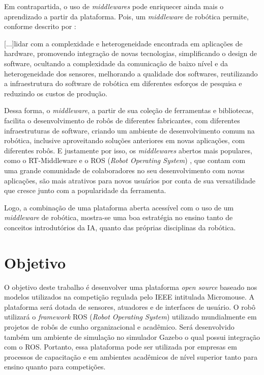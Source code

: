 Em contrapartida, o uso de \textit{middlewares} pode enriquecer ainda mais o aprendizado a partir da plataforma. Pois, um \textit{middleware} de robótica permite, conforme descrito por :

\begin{quoting}[rightmargin=0cm,leftmargin=4cm]
	\begin{singlespace}
		{\footnotesize
			[...]lidar com a complexidade e heterogeneidade encontrada em aplicações de hardware, promovendo integração de novas tecnologias, simplificando o design de software, ocultando a complexidade da comunicação de baixo nível e da heterogeneidade dos sensores, melhorando a qualidade dos softwares, reutilizando a infraestrutura do software de robótica em diferentes esforços de pesquisa e reduzindo os custos de produção.
		}
	\end{singlespace}
\end{quoting}

Dessa forma, o \textit{middleware}, a partir de sua coleção de ferramentas e bibliotecas, facilita o desenvolvimento de robôs de diferentes fabricantes, com diferentes infraestruturas de software, criando um ambiente de desenvolvimento comum na robótica, inclusive aproveitando soluções anteriores em novas aplicações, com diferentes robôs. E justamente por isso, os \textit{middlewares} abertos mais populares, como o RT-Middleware e o ROS (\textit{Robot Operating System}) \cite{Elkady2012}, que contam com uma grande comunidade de colaboradores no seu desenvolvimento com novas aplicações, são mais atrativos para novos usuários por conta de sua versatilidade que cresce junto com a popularidade da ferramenta.

Logo, a combinação de uma plataforma aberta acessível com o uso de um \textit{middleware} de robótica, mostra-se uma boa estratégia no ensino tanto de conceitos introdutórios da IA, quanto das próprias disciplinas da robótica.


\section{Objetivo}
\label{sec:objetivo_geral}
O objetivo deste trabalho é desenvolver uma plataforma \textit{open source} baseado nos modelos utilizados na competição regulada pelo IEEE intitulada Micromouse. A plataforma será dotada de sensores, atuadores e de interfaces de usuário. O robô utilizará o \textit{framework} ROS (\textit{Robot Operating System}) utilizado mundialmente em projetos de robôs de cunho organizacional e acadêmico. Será desenvolvido também um ambiente de simulação no simulador Gazebo o qual possui integração com o ROS. Portanto, essa plataforma pode ser utilizada por empresas em processos de capacitação e em ambientes acadêmicos de nível superior tanto para ensino quanto para competições.

